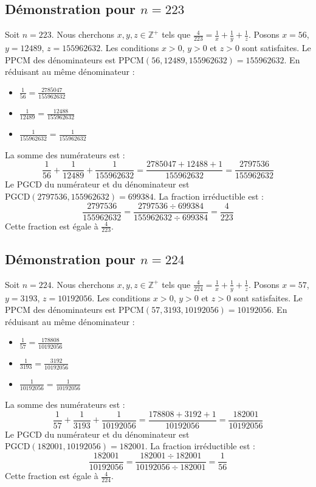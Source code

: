 \documentclass[11pt,a4paper]{article}
\begin{document}
\subsection{Démonstration pour $n = 223$}
Soit $n = 223$. Nous cherchons $x, y, z \in \mathbb{Z}^{+}$ tels que $\frac{4}{223} = \frac{1}{x} + \frac{1}{y} + \frac{1}{z}$.
Posons $x = 56$, $y = 12489$, $z = 155962632$.
Les conditions $x > 0$, $y > 0$ et $z > 0$ sont satisfaites.
Le PPCM des dénominateurs est $\text{PPCM}(56, 12489, 155962632) = 155962632$.
En réduisant au même dénominateur :
\begin{itemize}
    \item $\frac{1}{56} = \frac{2785047}{155962632}$
    \item $\frac{1}{12489} = \frac{12488}{155962632}$
    \item $\frac{1}{155962632} = \frac{1}{155962632}$
\end{itemize}
La somme des numérateurs est :
$$ \frac{1}{56} + \frac{1}{12489} + \frac{1}{155962632} = \frac{2785047 + 12488 + 1}{155962632} = \frac{2797536}{155962632} $$
Le PGCD du numérateur et du dénominateur est $\text{PGCD}(2797536, 155962632) = 699384$.
La fraction irréductible est :
$$ \frac{2797536}{155962632} = \frac{2797536 \div 699384}{155962632 \div 699384} = \frac{4}{223} $$
Cette fraction est égale à $\frac{4}{223}$.

\subsection{Démonstration pour $n = 224$}
Soit $n = 224$. Nous cherchons $x, y, z \in \mathbb{Z}^{+}$ tels que $\frac{4}{224} = \frac{1}{x} + \frac{1}{y} + \frac{1}{z}$.
Posons $x = 57$, $y = 3193$, $z = 10192056$.
Les conditions $x > 0$, $y > 0$ et $z > 0$ sont satisfaites.
Le PPCM des dénominateurs est $\text{PPCM}(57, 3193, 10192056) = 10192056$.
En réduisant au même dénominateur :
\begin{itemize}
    \item $\frac{1}{57} = \frac{178808}{10192056}$
    \item $\frac{1}{3193} = \frac{3192}{10192056}$
    \item $\frac{1}{10192056} = \frac{1}{10192056}$
\end{itemize}
La somme des numérateurs est :
$$ \frac{1}{57} + \frac{1}{3193} + \frac{1}{10192056} = \frac{178808 + 3192 + 1}{10192056} = \frac{182001}{10192056} $$
Le PGCD du numérateur et du dénominateur est $\text{PGCD}(182001, 10192056) = 182001$.
La fraction irréductible est :
$$ \frac{182001}{10192056} = \frac{182001 \div 182001}{10192056 \div 182001} = \frac{1}{56} $$
Cette fraction est égale à $\frac{4}{224}$.
\end{document}
